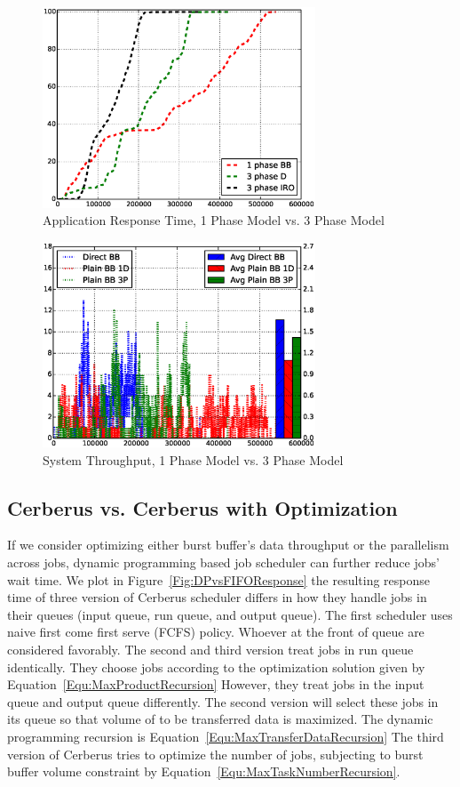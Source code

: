 \begin{figure}[!t]
        \centering
        \includegraphics[width=3.2in]{Draw3Pvs1P/1000jobs_3p_vs_1p_response}
        \caption{Application Response Time, 1 Phase Model vs. 3 Phase Model}
        \label{Fig:3Pvs1PResponse}
\end{figure}

\begin{figure}[!t]
        \centering
        \includegraphics[width=3.2in]{Draw3Pvs1P/1000jobs_3p_vs_1p_throughput}
        \caption{System Throughput, 1 Phase Model vs. 3 Phase Model}
        \label{Fig:3Pvs1PThroughput}
\end{figure}



\subsection{Cerberus vs. Cerberus with Optimization}
If we consider optimizing either burst buffer's data throughput or the parallelism across jobs,
dynamic programming based job scheduler can further reduce jobs' wait time.
We plot in Figure~\ref{Fig:DPvsFIFOResponse} the resulting response time of
three version of Cerberus scheduler differs in
how they handle jobs in their queues (input queue, run queue, and output queue).
The first scheduler uses naive first come first serve (FCFS) policy.
Whoever at the front of queue are considered favorably.
The second and third version treat jobs in run queue identically.
They choose jobs according to the optimization solution given by Equation~\ref{Equ:MaxProductRecursion}
However, they treat jobs in the input queue and output queue differently.
The second version will select these jobs in its queue so that
volume of to be transferred data is maximized.
The dynamic programming recursion is Equation~\ref{Equ:MaxTransferDataRecursion}
The third version of Cerberus tries to optimize the number of jobs,
subjecting to burst buffer volume constraint by Equation~\ref{Equ:MaxTaskNumberRecursion}.

